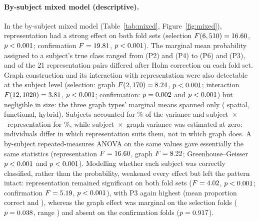 \paragraph{By-subject mixed model (descriptive).} In the by-subject mixed model (Table~\ref{tab:mixed}, Figure~\ref{fig:mixed}), representation
had a strong effect on both fold sets (selection $F(6,510)=16.60$,
$p<0.001$; confirmation $F=19.81$, $p<0.001$). The marginal mean probability assigned
to a subject's true class ranged from \mixSelMPTwo{} (P2) and \mixSelMPFour{} (P4) to \mixSelMPSix{} (P6)
and \mixSelMPThree{} (P3), and \mixSelNPairsSig{} of the 21 representation pairs differed after Holm
correction on each fold set. Graph construction and its interaction with representation were also
detectable at the subject level (selection: graph $F(2,170)=8.24$,
$p<0.001$; interaction $F(12,1020)=3.81$, $p<0.001$;
confirmation: $p=0.002$ and $p<0.001$) but negligible in size: the three graph types'
marginal means spanned only \mixSelEdgeRange{} (\mixSelMspatial{} spatial, \mixSelMfunctional{} functional,
\mixSelMhybrid{} hybrid). Subjects accounted for \mixSelShareSubject\% of the variance and
subject~$\times$~representation for \mixSelShareSubjectxrepresentation\%, while subject~$\times$~graph
variance was estimated at zero: individuals differ in which representation suits them, not in which
graph does. A by-subject repeated-measures ANOVA on the same values gave essentially the same statistics
(representation $F=16.60$, graph $F=8.22$; Greenhouse--Geisser $p<0.001$ and
$p<0.001$). Modelling whether each subject was correctly classified, rather than the probability,
weakened every effect but left the pattern intact: representation remained significant on both fold sets
($F=4.02$, $p<0.001$; confirmation $F=5.19$, $p<0.001$), with
P3 again highest (mean proportion correct \mixSelCorrMPThree{} and \mixConfCorrMPThree{}), whereas the graph
effect was marginal on the selection folds ($p=0.038$, range \mixSelCorrEdgeRange{}) and absent on
the confirmation folds ($p=0.917$).

